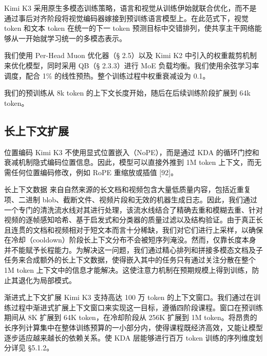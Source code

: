 Kimi K3 采用原生多模态训练策略，语言和视觉从训练伊始就联合优化，而不是通过事后对齐阶段将视觉编码器嫁接到预训练语言模型上。在此范式下，视觉 token 和文本 token 在统一的下一 token 预测目标中交错排列，使共享主干网络能够从一开始就学习统一的多模态表示。

我们使用 Per-Head Muon 优化器（§ 2.5）以及 Kimi K2 中引入的权重裁剪机制来优化模型，同时采用 QB（§ 2.3.3）进行 MoE 负载均衡。我们使用余弦学习率调度，配合 1\% 的线性预热。整个训练过程中权重衰减设为 0.1。

我们的预训练从 8k token 的上下文长度开始，随后在后续训练阶段扩展到 64k token。

\subsection{长上下文扩展}\label{long-context-extension}

位置编码 Kimi K3 不使用显式位置嵌入（NoPE），而是通过 KDA 的循环门控和衰减机制隐式编码位置信息。因此，模型可以直接外推到 1M token 上下文，而无需任何位置编码修改，例如 RoPE 重缩放或插值 {[}92{]}。

长上下文数据 来自自然来源的长文档和视频包含大量低质量内容，包括近重复项、二进制 blob、截断文件、视频片段和无效的机器生成日志。因此，我们通过一个专门的清洗流水线对其进行处理，该流水线结合了精确去重和模糊去重、针对视频的逐帧感知哈希、基于启发式和分类器的质量过滤以及结构验证。由于真正长且连贯的文档和视频相对于短文本而言十分稀缺，我们对它们进行上采样，以确保在冷却（cooldown）阶段长上下文分布不会被短序列淹没。然而，仅靠长度本身并不能赋予长程能力。为解决这一问题，我们通过精心排列和拼接多模态文档及子任务来合成额外的长上下文数据，使得嵌入其中的任务只有通过关注分散在整个 1M token 上下文中的信息才能解决。这使注意力机制在预期规模上得到训练，防止其退化为局部模式。

渐进式上下文扩展 Kimi K3 支持高达 100 万 token 的上下文窗口。我们通过在训练过程中渐进式扩展上下文窗口来实现这一目标，遵循四阶段课程。窗口在预训练期间从 8K 扩展到 64K token，在冷却阶段从 256K 扩展到 1M token。将昂贵的长序列计算集中在整体训练预算的一小部分内，使得课程既经济高效，又能让模型逐步适应越来越长的依赖关系。使 KDA 层能够进行百万 token 训练的序列维度划分详见 §5.1.2。

